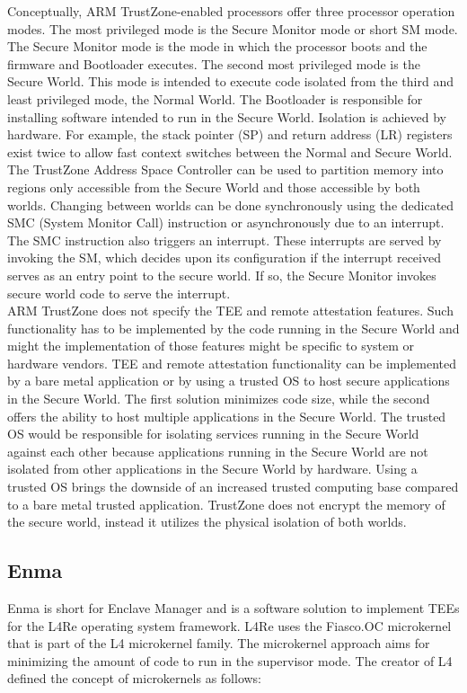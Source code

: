 Conceptually, ARM TrustZone-enabled processors offer three processor operation
modes. The most privileged mode is the Secure Monitor mode or short SM mode. The
Secure Monitor mode is the mode in which the processor boots and the firmware
and Bootloader executes. The second most privileged mode is the Secure World.
This mode is intended to execute code isolated from the third and least
privileged mode, the Normal World. The Bootloader is responsible for installing
software intended to run in the Secure World. Isolation is achieved by hardware.
For example, the stack pointer (SP) and return address (LR) registers exist
twice to allow fast context switches between the Normal and Secure World. The
TrustZone Address Space Controller can be used to partition memory into regions
only accessible from the Secure World and those accessible by both worlds.
Changing between worlds can be done synchronously using the dedicated SMC
(System Monitor Call) instruction or asynchronously due to an interrupt. The SMC
instruction also triggers an interrupt. These interrupts are served by invoking
the SM, which decides upon its configuration if the interrupt received serves as
an entry point to the secure world. If so, the Secure Monitor invokes secure
world code to serve the interrupt.\\

ARM TrustZone does not specify the TEE and remote attestation features. Such
functionality has to be implemented by the code running in the Secure World and
might the implementation of those features might be specific to system or
hardware vendors. TEE and remote attestation functionality can be implemented by
a bare metal application or by using a trusted OS to host secure applications in
the Secure World. The first solution minimizes code size, while the second
offers the ability to host multiple applications in the Secure World. The
trusted OS would be responsible for isolating services running in the Secure
World against each other because applications running in the Secure World are
not isolated from other applications in the Secure World by hardware. Using a
trusted OS brings the downside of an increased trusted computing base compared
to a bare metal trusted application. TrustZone does not encrypt the memory of
the secure world, instead it utilizes the physical isolation of both worlds.\\

\subsection{Enma}
\label{sec:20:enma}
Enma is short for Enclave Manager and is a software solution to implement TEEs
for the L4Re operating system framework. \cite{reitz_isolierende_2019} L4Re uses
the Fiasco.OC microkernel that is part of the L4 microkernel family. The
microkernel approach aims for minimizing the amount of code to run in the
supervisor mode. The creator of L4 defined the concept of microkernels as
follows:

